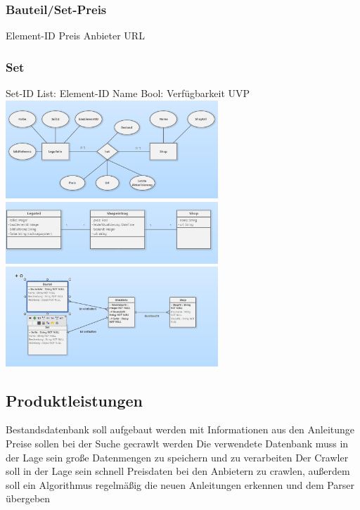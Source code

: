\subsubsection{Bauteil/Set-Preis}
Element-ID\newline
Preis\newline
Anbieter\newline
URL\newline

\subsubsection{Set}
Set-ID \newline
List: Element-ID \newline
Name \newline
Bool: Verfügbarkeit \newline
UVP \newline  \newline
\includegraphics[width=8cm]{pictures/chen1.png} \newline  \newline
\includegraphics[width=8cm]{pictures/klassendiagramm2.png}  \newline  \newline
\includegraphics[width=8cm]{pictures/klassendiagramm.png} 

\subsection{Produktleistungen}
Bestandsdatenbank soll aufgebaut werden mit Informationen aus den Anleitunge \newline
Preise sollen bei der Suche gecrawlt werden \newline
Die verwendete Datenbank muss in der Lage sein große Datenmengen zu speichern und zu verarbeiten \newline
Der Crawler soll in der Lage sein schnell Preisdaten bei den Anbietern zu crawlen, außerdem soll ein Algorithmus regelmäßig die neuen Anleitungen erkennen und dem Parser übergeben \newline

